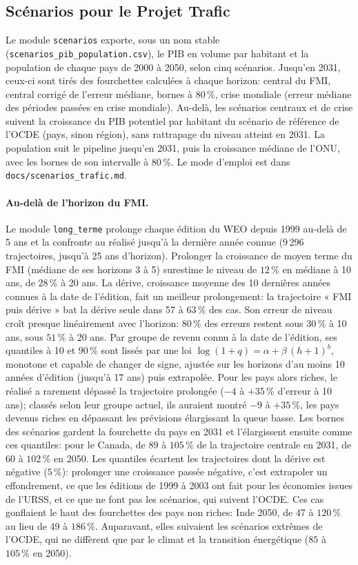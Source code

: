 \documentclass[11pt,a4paper]{article}
\begin{document}
\subsection{Scénarios pour le Projet Trafic}
Le module \texttt{scenarios} exporte, sous un nom stable (\texttt{scenarios\_pib\_population.csv}), le PIB en volume par habitant et la population de chaque pays de 2000 à 2050, selon cinq scénarios. Jusqu'en 2031, ceux-ci sont tirés des fourchettes calculées à chaque horizon: central du FMI, central corrigé de l'erreur médiane, bornes à $80\,\%$, crise mondiale (erreur médiane des périodes passées en crise mondiale). Au-delà, les scénarios centraux et de crise suivent la croissance du PIB potentiel par habitant du scénario de référence de l'OCDE (pays, sinon région), sans rattrapage du niveau atteint en 2031. La population suit le pipeline jusqu'en 2031, puis la croissance médiane de l'ONU, avec les bornes de son intervalle à $80\,\%$. Le mode d'emploi est dans \texttt{docs/scenarios\_trafic.md}.

\paragraph{Au-delà de l'horizon du FMI.} Le module \texttt{long\_terme} prolonge chaque édition du WEO depuis 1999 au-delà de 5 ans et la confronte au réalisé jusqu'à la dernière année connue (9\,296 trajectoires, jusqu'à 25 ans d'horizon). Prolonger la croissance de moyen terme du FMI (médiane de ses horizons 3 à 5) surestime le niveau de $12\,\%$ en médiane à 10 ans, de $28\,\%$ à 20 ans. La dérive, croissance moyenne des 10 dernières années connues à la date de l'édition, fait un meilleur prolongement: la trajectoire « FMI puis dérive » bat la dérive seule dans 57 à $63\,\%$ des cas. Son erreur de niveau croît presque linéairement avec l'horizon: $80\,\%$ des erreurs restent sous $30\,\%$ à 10 ans, sous $51\,\%$ à 20 ans. Par groupe de revenu connu à la date de l'édition, ses quantiles à 10 et $90\,\%$ sont lissés par une loi $\log(1 + q) = \alpha + \beta\,(h + 1)^b$, monotone et capable de changer de signe, ajustée sur les horizons d'au moins 10 années d'édition (jusqu'à 17 ans) puis extrapolée. Pour les pays alors riches, le réalisé a rarement dépassé la trajectoire prolongée ($-4$ à $+35\,\%$ d'erreur à 10 ans); classés selon leur groupe actuel, ils auraient montré $-9$ à $+35\,\%$, les pays devenus riches en dépassant les prévisions élargissant la queue basse. Les bornes des scénarios gardent la fourchette du pays en 2031 et l'élargissent ensuite comme ces quantiles: pour le Canada, de $89$ à $105\,\%$ de la trajectoire centrale en 2031, de $60$ à $102\,\%$ en 2050. Les quantiles écartent les trajectoires dont la dérive est négative ($5\,\%$): prolonger une croissance passée négative, c'est extrapoler un effondrement, ce que les éditions de 1999 à 2003 ont fait pour les économies issues de l'URSS, et ce que ne font pas les scénarios, qui suivent l'OCDE. Ces cas gonflaient le haut des fourchettes des pays non riches: Inde 2050, de 47 à $120\,\%$ au lieu de 49 à $186\,\%$. Auparavant, elles suivaient les scénarios extrêmes de l'OCDE, qui ne diffèrent que par le climat et la transition énergétique ($85$ à $105\,\%$ en 2050).
\end{document}
